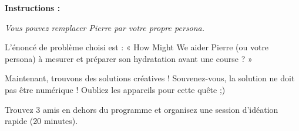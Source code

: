 \makeheaderfiles

\textbf{Instructions :}

\emph{Vous pouvez remplacer Pierre par votre propre persona.}

L'énoncé de problème choisi est : « How Might We aider Pierre (ou votre persona) à mesurer et préparer son hydratation avant une course ? »

Maintenant, trouvons des solutions créatives ! Souvenez-vous, la solution ne doit pas être numérique ! Oubliez les appareils pour cette quête ;)

Trouvez 3 amis en dehors du programme et organisez une session d'idéation rapide (20 minutes).

